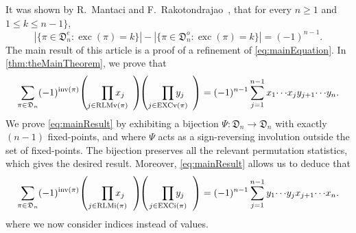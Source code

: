 \documentclass[reqno]{amsart}
\theoremstyle{definition}
\newcommand{\dArr}{\mathfrak{D}}
\newcommand{\frether}{\Psi}
\DeclareMathOperator{\inv}{inv}
\DeclareMathOperator{\exc}{exc}
\DeclareMathOperator{\EXCi}{EXCi}
\DeclareMathOperator{\EXCv}{EXCv}
\DeclareMathOperator{\RLMv}{RLMv}
\DeclareMathOperator{\RLMi}{RLMi}
\begin{document}
It was shown by R.~Mantaci and F.~Rakotondrajao~\cite[Cor. 5.11]{MantaciRakotondrajao2003},
that for every $n\geq 1$ and $1 \leq k \leq n-1\}$,
\begin{equation}\label{eq:mainEquation}
 |\{ \pi \in \dArr^e_n  : \exc(\pi) = k \}|
 -
 |\{ \pi \in \dArr^o_n  : \exc(\pi)=k \}|
 =(-1)^{n-1}.
\end{equation}
%
The main result of this article is a
proof of a refinement of \eqref{eq:mainEquation}.
In \cref{thm:theMainTheorem}, we prove that
\begin{equation}\label{eq:mainResult}
 \sum_{\pi \in \dArr_n} (-1)^{\inv(\pi)} \!
 \left( \hspace{5mm}
 \prod_{\mathclap{j\in \RLMv(\pi)}}  x_j 
 \hspace{3mm}
 \right)
 \!\!
 \left( \hspace{5mm}
 \prod_{\mathclap{j\in \EXCv(\pi)}}  y_{j}
 \hspace{3mm}
 \right)
 = 
 (-1)^{n-1} \sum_{j=1}^{n-1} x_1 \!\dotsm \! x_j y_{j+1}  \!\dotsm  \! y_{n}.
\end{equation}
%
We prove \eqref{eq:mainResult} by
exhibiting a bijection $\frether: \dArr_n \to \dArr_n$
with exactly $(n-1)$ fixed-points,
and where $\frether$ acts as a sign-reversing involution
outside the set of fixed-points.
The bijection preserves all
the relevant permutation statistics,
which gives the desired result.
Moreover, \eqref{eq:mainResult} allows us to deduce that
\begin{equation}\label{eq:mainResult2}
\sum_{\pi \in \dArr_n} (-1)^{\inv(\pi)} \!
 \left( \hspace{5mm}
 \prod_{\mathclap{j\in \RLMi(\pi)}}  x_j 
 \hspace{3mm}
 \right)
 \!\!
 \left( \hspace{5mm}
 \prod_{\mathclap{j\in \EXCi(\pi)}}  y_{j}
 \hspace{3mm}
 \right)
 = 
 (-1)^{n-1} \sum_{j=1}^{n-1} y_1 \!\dotsm \! y_j x_{j+1}  \!\dotsm  \! x_{n}.
\end{equation}
where we now consider indices instead of values.

\bigskip 
\end{document}
